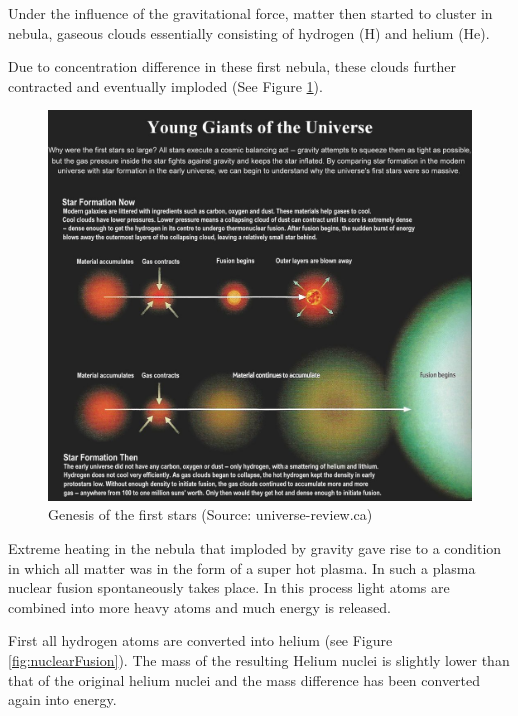\documentclass[
  11pt,
]{book}
\begin{document}
Under the influence of the gravitational force, matter then started to cluster in nebula, gaseous clouds essentially consisting of hydrogen (H) and helium (He).

Due to concentration difference in these first nebula, these clouds further contracted and eventually imploded (See Figure \ref{fig:genesisStar}).

\begin{figure}

{\centering \includegraphics[width=1\linewidth]{./figs/I08-13-firststars6} 

}

\caption{Genesis of the first stars (Source: universe-review.ca)}\label{fig:genesisStar}
\end{figure}

Extreme heating in the nebula that imploded by gravity gave rise to a condition in which all matter was in the form of a super hot plasma.
In such a plasma nuclear fusion spontaneously takes place. In this process light atoms are combined into more heavy atoms and much energy is released.

First all hydrogen atoms are converted into helium (see Figure \ref{fig:nuclearFusion}). The mass of the resulting Helium nuclei is slightly lower than that of the original helium nuclei and the mass difference has been converted again into energy.
\end{document}
